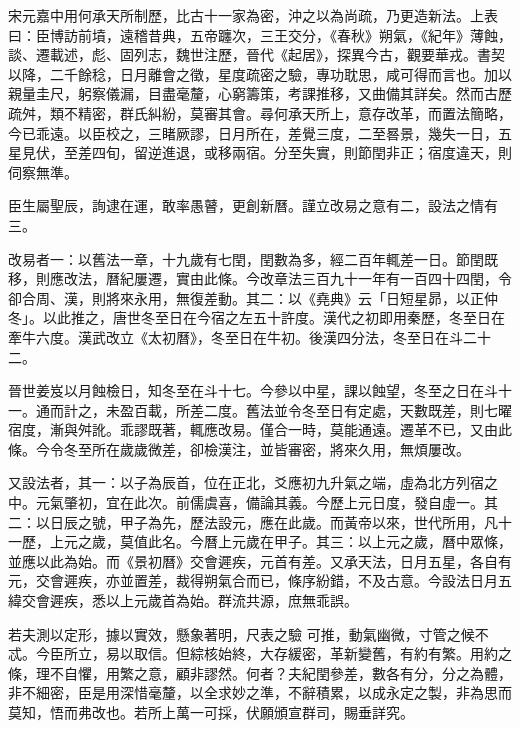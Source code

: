 \begin{pinyinscope}
 宋元嘉中用何承天所制歷，比古十一家為密，沖之以為尚疏，乃更造新法。上表曰：臣博訪前墳，遠稽昔典，五帝躔次，三王交分，《春秋》朔氣，《紀年》薄蝕，談、遷載述，彪、固列志，魏世注歷，晉代《起居》，探異今古，觀要華戎。書契以降，二千餘稔，日月離會之徵，星度疏密之驗，專功耽思，咸可得而言也。加以親量圭尺，躬察儀漏，目盡毫釐，心窮籌策，考課推移，又曲備其詳矣。然而古歷
 疏舛，類不精密，群氏糾紛，莫審其會。尋何承天所上，意存改革，而置法簡略，今已乖遠。以臣校之，三睹厥謬，日月所在，差覺三度，二至晷景，幾失一日，五星見伏，至差四旬，留逆進退，或移兩宿。分至失實，則節閏非正；宿度違天，則伺察無準。



 臣生屬聖辰，詢逮在運，敢率愚瞽，更創新曆。謹立改易之意有二，設法之情有三。



 改易者一：以舊法一章，十九歲有七閏，閏數為多，經二百年輒差一日。節閏既移，則應改法，曆紀屢遷，實由此條。今改章法三百九十一年有一百四十四閏，令卻合周、漢，則將來永用，無復差動。其二：以《堯典》云「日短星昴，以正仲冬」。以此推之，唐世冬至日在今宿之左五十許度。漢代之初即用秦歷，冬至日在牽牛六度。漢武改立《太初曆》，冬至日在牛初。後漢四分法，冬至日在斗二十二。



 晉世姜岌以月蝕檢日，知冬至在斗十七。今參以中星，課以蝕望，冬至之日在斗十
 一。通而計之，未盈百載，所差二度。舊法並令冬至日有定處，天數既差，則七曜宿度，漸與舛訛。乖謬既著，輒應改易。僅合一時，莫能通遠。遷革不已，又由此條。今令冬至所在歲歲微差，卻檢漢注，並皆審密，將來久用，無煩屢改。



 又設法者，其一：以子為辰首，位在正北，爻應初九升氣之端，虛為北方列宿之中。元氣肇初，宜在此次。前儒虞喜，備論其義。今歷上元日度，發自虛一。其二：以日辰之號，甲子為先，歷法設元，應在此歲。而黃帝以來，世代所用，凡十一歷，上元之歲，莫值此名。今曆上元歲在甲子。其三：以上元之歲，曆中眾條，並應以此為始。而《景初曆》交會遲疾，元首有差。又承天法，日月五星，各自有元，交會遲疾，亦並置差，裁得朔氣合而已，條序紛錯，不及古意。今設法日月五緯交會遲疾，悉以上元歲首為始。群流共源，庶無乖誤。



 若夫測以定形，據以實效，懸象著明，尺表之驗
 可推，動氣幽微，寸管之候不忒。今臣所立，易以取信。但綜核始終，大存緩密，革新變舊，有約有繁。用約之條，理不自懼，用繁之意，顧非謬然。何者？夫紀閏參差，數各有分，分之為體，非不細密，臣是用深惜毫釐，以全求妙之準，不辭積累，以成永定之製，非為思而莫知，悟而弗改也。若所上萬一可採，伏願頒宣群司，賜垂詳究。




\end{pinyinscope}
